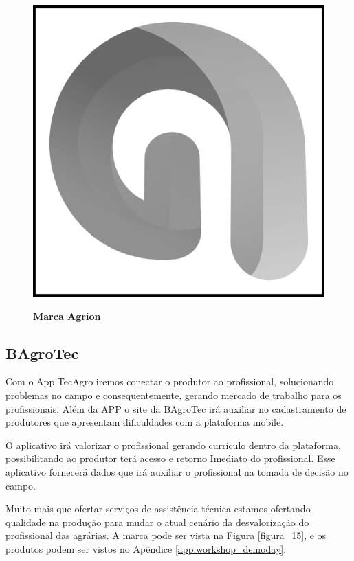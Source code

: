 \begin{figure}[H]
\centering
\caption{\textbf{Marca Agrion}}
\includegraphics[scale=0.07]{Imagens/agrion.png}
\label{figura_14}
\end{figure}

\subsection{BAgroTec}

Com o App TecAgro iremos conectar o produtor ao profissional, solucionando problemas no campo e consequentemente, gerando mercado de trabalho para os profissionais. Além da APP o site da BAgroTec irá auxiliar no cadastramento de produtores que apresentam dificuldades com a plataforma mobile.

O aplicativo irá valorizar o profissional gerando currículo dentro da plataforma, possibilitando ao produtor terá acesso e retorno Imediato do profissional. Esse aplicativo fornecerá dados que irá auxiliar o profissional na tomada de decisão no campo.

Muito mais que ofertar serviços de assistência técnica estamos ofertando qualidade na produção para mudar o atual cenário da desvalorização do profissional das agrárias. A marca pode ser vista na Figura \ref{figura_15}, e os produtos podem ser vistos no Apêndice \ref{app:workshop_demoday}.


